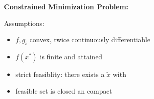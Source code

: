 \documentclass[8pt,a4paper]{scrartcl}
\begin{document}
\begin{multicols*}{3}
\begin{multicols*}{4}
{\textbf{Constrained Minimization Problem:}


Assumptions:

\begin{itemize}

\item $f,g_i$ convex, twice continuously differentiable
\item $f(x^\ast)$ is finite and attained
\item strict feasiblity: there exists a $\tilde{x}$ with 


\item feasible set is closed an compact
\end{itemize}
}%


\end{multicols*}
\end{multicols*}
\end{document}
